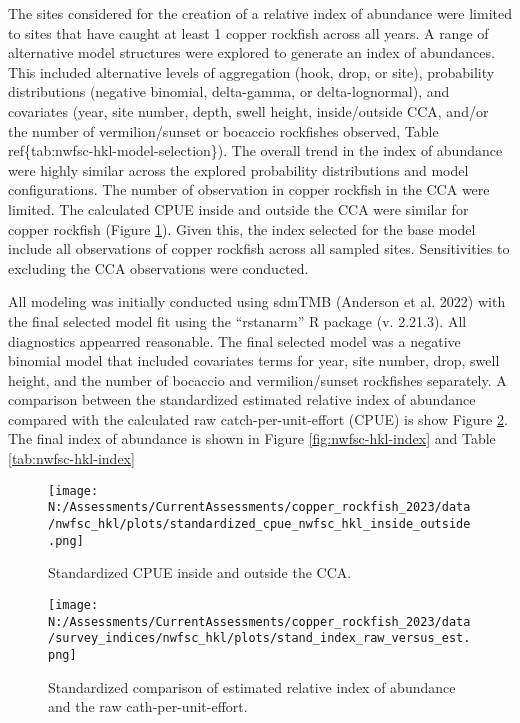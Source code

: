 \documentclass[11pt,
  english,
  letterpaper,
]{article}
\begin{document}
The sites considered for the creation of a relative index of abundance were limited to sites that have caught at least 1 copper rockfish across all years. A range of alternative model structures were explored to generate an index of abundances. This included alternative levels of aggregation (hook, drop, or site), probability distributions (negative binomial, delta-gamma, or delta-lognormal), and covariates (year, site number, depth, swell height, inside/outside CCA, and/or the number of vermilion/sunset or bocaccio rockfishes observed, Table ref\{tab:nwfsc-hkl-model-selection\}). The overall trend in the index of abundance were highly similar across the explored probability distributions and model configurations. The number of observation in copper rockfish in the CCA were limited. The calculated CPUE inside and outside the CCA were similar for copper rockfish (Figure \ref{fig:nwfsc-hkl-cca}). Given this, the index selected for the base model include all observations of copper rockfish across all sampled sites. Sensitivities to excluding the CCA observations were conducted.

All modeling was initially conducted using sdmTMB (Anderson et al. 2022) with the final selected model fit using the ``rstanarm'' R package (v. 2.21.3). All diagnostics appearred reasonable. The final selected model was a negative binomial model that included covariates terms for year, site number, drop, swell height, and the number of bocaccio and vermilion/sunset rockfishes separately. A comparison between the standardized estimated relative index of abundance compared with the calculated raw catch-per-unit-effort (CPUE) is show Figure \ref{fig:nwfsc-hkl-index-raw}. The final index of abundance is shown in Figure \ref{fig:nwfsc-hkl-index} and Table \ref{tab:nwfsc-hkl-index}

\pagebreak



\begin{figure}
\centering
\texttt{[image: N:/Assessments/CurrentAssessments/copper\_rockfish\_2023/data/nwfsc\_hkl/plots/standardized\_cpue\_nwfsc\_hkl\_inside\_outside.png]}
\caption{Standardized CPUE inside and outside the CCA.\label{fig:nwfsc-hkl-cca}}
\end{figure}

\newpage

\begin{figure}
\centering
\texttt{[image: N:/Assessments/CurrentAssessments/copper\_rockfish\_2023/data/survey\_indices/nwfsc\_hkl/plots/stand\_index\_raw\_versus\_est.png]}
\caption{Standardized comparison of estimated relative index of abundance and the raw cath-per-unit-effort.\label{fig:nwfsc-hkl-index-raw}}
\end{figure}
\end{document}
